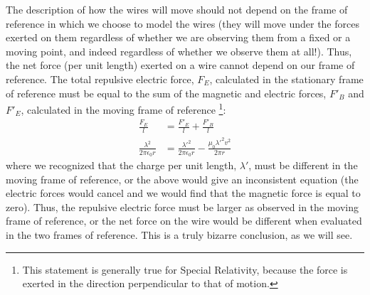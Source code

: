 The description of how the wires will move should not depend on the frame of reference in which we choose to model the wires (they will move under the forces exerted on them regardless of whether we are observing them from a fixed or a moving point, and indeed regardless of whether we observe them at all!). Thus, the net force (per unit length) exerted on a wire cannot depend on our frame of reference. The total repulsive electric force, $F_E$, calculated in the stationary frame of reference must be equal to the sum of the magnetic and electric forces, $F'_B$ and $F'_E$, calculated in the moving frame of reference \footnote{This statement is generally true for Special Relativity, because the force is exerted in the direction perpendicular to that of motion.}:
\begin{align*}
\frac{F_E}{l}&=\frac{F'_E}{l}+\frac{F'_B}{l}\\
\frac{\lambda^2}{2\pi \epsilon_0r}&=\frac{\lambda'^2}{2\pi \epsilon_0r}  -\frac{\mu_0 \lambda'^2 v^2}{2\pi r}
\end{align*}
where we recognized that the charge per unit length, $\lambda'$, must be different in the moving frame of reference, or the above would give an inconsistent equation (the electric forces would cancel and we would find that the magnetic force is equal to zero). Thus, the repulsive electric force must be larger as observed in the moving frame of reference, or the net force on the wire would be different when evaluated in the two frames of reference. This is a truly bizarre conclusion, as we will see.

